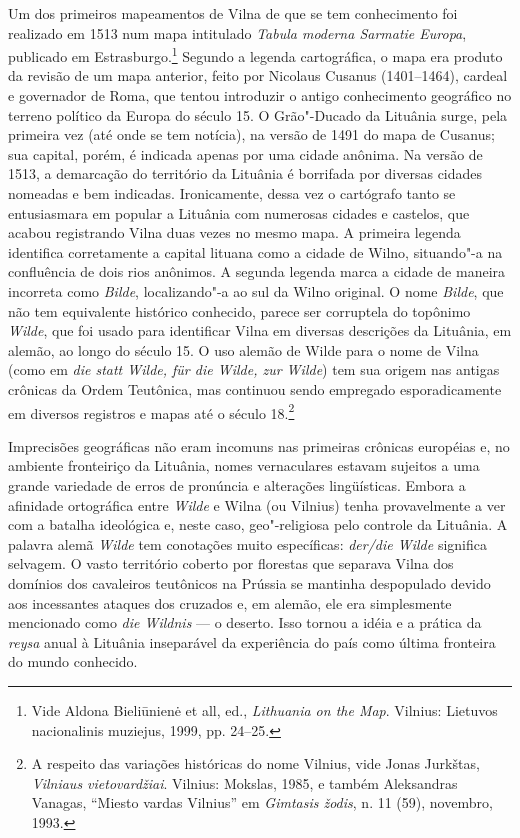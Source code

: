 Um dos primeiros mapeamentos de Vilna de que se tem conhecimento foi
realizado em 1513 num mapa intitulado \emph{Tabula moderna Sarmatie
Europa}, publicado em Estrasburgo.\footnote{Vide Aldona Bieliūnienė et
  all, ed., \emph{Lithuania on the Map}. Vilnius: Lietuvos nacionalinis
  muziejus, 1999, pp. 24--25.} Segundo a legenda cartográfica, o mapa era
produto da revisão de um mapa anterior, feito por Nicolaus Cusanus
(1401--1464), cardeal e governador de Roma, que tentou introduzir o
antigo conhecimento geográfico no terreno político da Europa do século
15. O Grão"-Ducado da Lituânia surge, pela primeira vez (até onde se tem
notícia), na versão de 1491 do mapa de Cusanus; sua capital, porém, é
indicada apenas por uma cidade anônima. Na versão de 1513, a demarcação
do território da Lituânia é borrifada por diversas cidades nomeadas e
bem indicadas. Ironicamente, dessa vez o cartógrafo tanto se
entusiasmara em popular a Lituânia com numerosas cidades e castelos, que
acabou registrando Vilna duas vezes no mesmo mapa. A primeira legenda
identifica corretamente a capital lituana como a cidade de Wilno,
situando"-a na confluência de dois rios anônimos. A segunda legenda marca
a cidade de maneira incorreta como \emph{Bilde}, localizando"-a ao sul da
Wilno original. O nome \emph{Bilde}, que não tem equivalente histórico
conhecido, parece ser corruptela do topônimo \emph{Wilde}, que foi usado
para identificar Vilna em diversas descrições da Lituânia, em alemão, ao
longo do século 15. O uso alemão de Wilde para o nome de Vilna (como em
\emph{die statt Wilde, für die Wilde, zur Wilde}) tem sua origem nas
antigas crônicas da Ordem Teutônica, mas continuou sendo empregado
esporadicamente em diversos registros e mapas até o século 18.\footnote{A
  respeito das variações históricas do nome Vilnius, vide Jonas
  Jurkštas, \emph{Vilniaus vietovardžiai}. Vilnius: Mokslas, 1985, e
  também Aleksandras Vanagas, ``Miesto vardas Vilnius'' em
  \emph{Gimtasis žodis}, n. 11 (59), novembro, 1993.}

Imprecisões geográficas não eram incomuns nas primeiras crônicas
européias e, no ambiente fronteiriço da Lituânia, nomes vernaculares
estavam sujeitos a uma grande variedade de erros de pronúncia e
alterações lingüísticas. Embora a afinidade ortográfica entre
\emph{Wilde} e Wilna (ou Vilnius) tenha provavelmente a ver com a
batalha ideológica e, neste caso, geo"-religiosa pelo controle da
Lituânia. A palavra alemã \emph{Wilde} tem conotações muito específicas:
\emph{der/die Wilde} significa selvagem. O vasto território coberto por
florestas que separava Vilna dos domínios dos cavaleiros teutônicos na
Prússia se mantinha despopulado devido aos incessantes ataques dos
cruzados e, em alemão, ele era simplesmente mencionado como \emph{die
Wildnis} --- o deserto. Isso tornou a idéia e a prática da \emph{reysa}
anual à Lituânia inseparável da experiência do país como última
fronteira do mundo conhecido.

